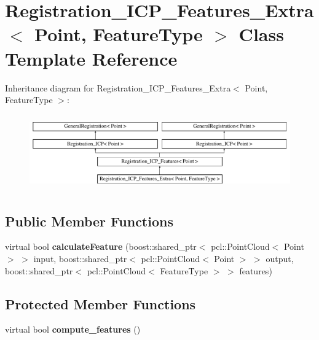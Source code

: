 \hypertarget{classRegistration__ICP__Features__Extra}{
\section{Registration\_\-ICP\_\-Features\_\-Extra$<$ Point, FeatureType $>$ Class Template Reference}
\label{classRegistration__ICP__Features__Extra}
}
Inheritance diagram for Registration\_\-ICP\_\-Features\_\-Extra$<$ Point, FeatureType $>$:\begin{figure}[H]
\begin{center}
\leavevmode
\includegraphics[height=3.303835cm]{classRegistration__ICP__Features__Extra}
\end{center}
\end{figure}
\subsection*{Public Member Functions}
\begin{DoxyCompactItemize}
\item 
\hypertarget{classRegistration__ICP__Features__Extra_a23c8c445eb40c1a84f3d725783ed43c3}{
virtual bool {\bfseries calculateFeature} (boost::shared\_\-ptr$<$ pcl::PointCloud$<$ Point $>$ $>$ input, boost::shared\_\-ptr$<$ pcl::PointCloud$<$ Point $>$ $>$ output, boost::shared\_\-ptr$<$ pcl::PointCloud$<$ FeatureType $>$ $>$ features)}
\label{classRegistration__ICP__Features__Extra_a23c8c445eb40c1a84f3d725783ed43c3}

\end{DoxyCompactItemize}
\subsection*{Protected Member Functions}
\begin{DoxyCompactItemize}
\item 
\hypertarget{classRegistration__ICP__Features__Extra_a16c5ac8403f6786f449e44b75684ab36}{
virtual bool {\bfseries compute\_\-features} ()}
\label{classRegistration__ICP__Features__Extra_a16c5ac8403f6786f449e44b75684ab36}

\end{DoxyCompactItemize}
